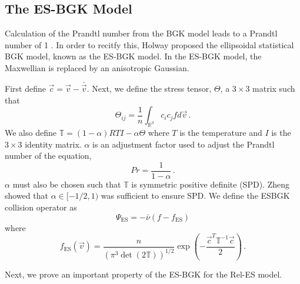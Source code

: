 \documentclass[12pt]{CSUNthesis}
\def\T{\mathbb{T}}
\def\R{\mathbb{R}}
\def\T{\mathbb{T}}
\def\R{\mathbb{R}}
\newcommand{\vecv}{\vec{v}}
\begin{document}
\subsection{The ES-BGK Model}
Calculation of the Prandtl number from the BGK model leads to a Prandtl number of 1 \cite{Struchtrup2005}. In order to recitfy this, Holway \cite{H66} proposed the ellipsoidal statistical BGK model, known as the ES-BGK model. In the ES-BGK model, the Maxwellian is replaced by an anisotropic Gaussian.

First define $\vec{c} = \vecv - \bar{\vecv}$. Next, we define the stress tensor, $\Theta$, a $3 \times 3$ matrix such that
\begin{equation}
\Theta_{ij} = \frac{1}{n} \int_{\R^3} c_i c_j f d\vecv \, .
\end{equation}
We also define $\T = (1-\alpha)RTI-\alpha \Theta$ where $T$ is the temperature and $I$ is the $3 \times 3$ identity matrix. $\alpha$ is an adjustment factor used to adjust the Prandtl number of the equation,
\begin{equation}
Pr = \frac{1}{1-\alpha} \, .
\end{equation}
$\alpha$ must also be chosen such that $\T$ is symmetric positive definite (SPD). Zheng \cite{ZhengY2004} showed that $\alpha \in [-1/2,1)$ was sufficient to ensure SPD. We define the ESBGK collision operator as 
\begin{equation}
\label{eq:esbgk}
\Psi_{\text{ES}} = - \bar{\nu}(f-f_{\text{ES}})
\end{equation}
where
\begin{equation}
f_{\text{ES}}(\vecv) = \frac{n}{(\pi^3 \det(2\T))^{1/2}} \exp(-\frac{\vec{c}^T \T^{-1} \vec{c}}{2}) \, .
\end{equation}

Next, we prove an important property of the ES-BGK for the Rel-ES model.
\end{document}
